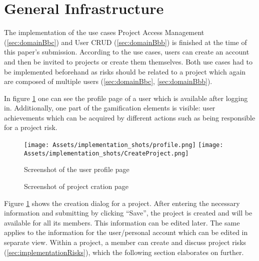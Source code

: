 \section{General Infrastructure}
\label{sec:implementationInfra}



The implementation of the use cases Project Access Management (\ref{sec:domainBbc}) and User CRUD (\ref{sec:domainBbb}) is finished at the time of this paper's submission. According to the use cases, users can create an account and then be invited to projects or create them themselves. Both use cases had to be implemented beforehand as risks should be related to a project which again are composed of multiple users (\ref{sec:domainBbc}, \ref{sec:domainBbb}).

In figure \ref{fig:ShotProfileCreation} one can see the profile page of a user which is available after logging in. Additionally, one part of the gamification elements is visible: user achievements which can be acquired by different actions such as being responsible for a project risk.

\begin{figure}[H]
	\centering
	\texttt{[image: Assets/implementation\_shots/profile.png]}	
	\texttt{[image: Assets/implementation\_shots/CreateProject.png]}
	\caption{Screenshot of the user profile page}
	\caption{Screenshot of project cration page}
	\label{fig:ShotProfileCreation}
\end{figure}

Figure \ref{fig:ShotProfileCreation} shows the creation dialog for a project. After entering the necessary information and submitting by clicking “Save”, the project is created and will be available for all its members. This information can be edited later. The same applies to the information for the user/personal account which can be edited in separate view. Within a project, a member can create and discuss project risks (\ref{sec:implementationRisks}), which the following section elaborates on further.


